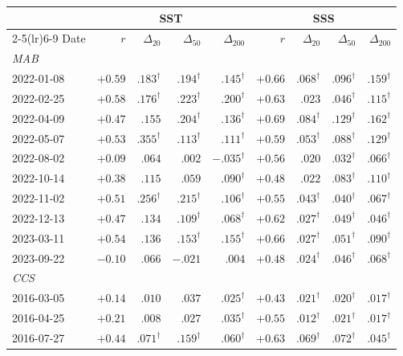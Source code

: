 \begin{tabular}{l r rrr r rrr}
\toprule
 & \multicolumn{4}{c}{SST} & \multicolumn{4}{c}{SSS} \\
\cmidrule(lr){2-5}\cmidrule(lr){6-9}
Date & $r$ & $\Delta_{20}$ & $\Delta_{50}$ & $\Delta_{200}$
     & $r$ & $\Delta_{20}$ & $\Delta_{50}$ & $\Delta_{200}$ \\
\midrule
\multicolumn{9}{l}{\emph{MAB}}\\
2022-01-08 & $+0.59$ & $.183^\dagger$ & $.194^\dagger$ & $.145^\dagger$ & $+0.66$ & $.068^\dagger$ & $.096^\dagger$ & $.159^\dagger$ \\
2022-02-25 & $+0.58$ & $.176^\dagger$ & $.223^\dagger$ & $.200^\dagger$ & $+0.63$ & $.023$ & $.046^\dagger$ & $.115^\dagger$ \\
2022-04-09 & $+0.47$ & $.155$ & $.204^\dagger$ & $.136^\dagger$ & $+0.69$ & $.084^\dagger$ & $.129^\dagger$ & $.162^\dagger$ \\
2022-05-07 & $+0.53$ & $.355^\dagger$ & $.113^\dagger$ & $.111^\dagger$ & $+0.59$ & $.053^\dagger$ & $.088^\dagger$ & $.129^\dagger$ \\
2022-08-02 & $+0.09$ & $.064$ & $.002$ & $-.035^\dagger$ & $+0.56$ & $.020$ & $.032^\dagger$ & $.066^\dagger$ \\
2022-10-14 & $+0.38$ & $.115$ & $.059$ & $.090^\dagger$ & $+0.48$ & $.022$ & $.083^\dagger$ & $.110^\dagger$ \\
2022-11-02 & $+0.51$ & $.256^\dagger$ & $.215^\dagger$ & $.106^\dagger$ & $+0.55$ & $.043^\dagger$ & $.040^\dagger$ & $.067^\dagger$ \\
2022-12-13 & $+0.47$ & $.134$ & $.109^\dagger$ & $.068^\dagger$ & $+0.62$ & $.027^\dagger$ & $.049^\dagger$ & $.046^\dagger$ \\
2023-03-11 & $+0.54$ & $.136$ & $.153^\dagger$ & $.155^\dagger$ & $+0.66$ & $.027^\dagger$ & $.051^\dagger$ & $.090^\dagger$ \\
2023-09-22 & $-0.10$ & $.066$ & $-.021$ & $.004$ & $+0.48$ & $.024^\dagger$ & $.046^\dagger$ & $.068^\dagger$ \\
\midrule
\multicolumn{9}{l}{\emph{CCS}}\\
2016-03-05 & $+0.14$ & $.010$ & $.037$ & $.025^\dagger$ & $+0.43$ & $.021^\dagger$ & $.020^\dagger$ & $.017^\dagger$ \\
2016-04-25 & $+0.21$ & $.008$ & $.027$ & $.035^\dagger$ & $+0.55$ & $.012^\dagger$ & $.021^\dagger$ & $.017^\dagger$ \\
2016-07-27 & $+0.44$ & $.071^\dagger$ & $.159^\dagger$ & $.060^\dagger$ & $+0.63$ & $.069^\dagger$ & $.072^\dagger$ & $.045^\dagger$ \\

\end{tabular}
